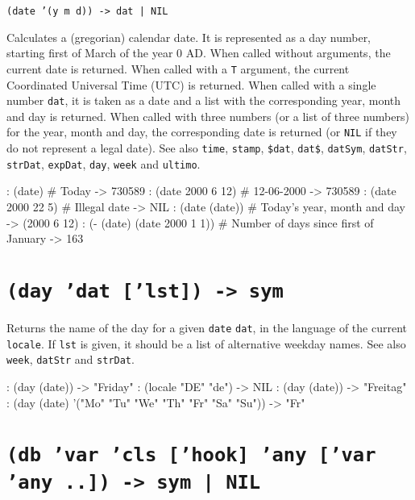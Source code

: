 {\texttt{(date '(y m d)) -> dat | NIL}

Calculates a (gregorian) calendar date. It is represented as a day
number, starting first of March of the year 0 AD. When called without
arguments, the current date is returned. When called with a \texttt{T}
argument, the current Coordinated Universal Time (UTC) is returned. When
called with a single number \texttt{dat}, it is taken as a date and a list with
the corresponding year, month and day is returned. When called with
three numbers (or a list of three numbers) for the year, month and day,
the corresponding date is returned (or \texttt{NIL} if they do not represent a
legal date). See also \texttt{time}, \texttt{stamp}, \texttt{\$dat}, \texttt{dat\$}, \texttt{datSym},
\texttt{datStr}, \texttt{strDat}, \texttt{expDat}, \texttt{day}, \texttt{week} and \texttt{ultimo}.


\begin{wideverbatim}
: (date)                         # Today
-> 730589
: (date 2000 6 12)               # 12-06-2000
-> 730589
: (date 2000 22 5)               # Illegal date
-> NIL
: (date (date))                  # Today's year, month and day
-> (2000 6 12)
: (- (date) (date 2000 1 1))     # Number of days since first of January
-> 163
\end{wideverbatim}

 
\section*{\texttt{(day 'dat ['lst]) -> sym}}
\label{sec:func-ref-D-(day 'dat ['lst]) -> sym}


Returns the name of the day for a given \texttt{date} \texttt{dat}, in the language of
the current \texttt{locale}. If \texttt{lst} is given, it should be a list of
alternative weekday names. See also \texttt{week}, \texttt{datStr} and \texttt{strDat}.


\begin{wideverbatim}
: (day (date))
-> "Friday"
: (locale "DE" "de")
-> NIL
: (day (date))
-> "Freitag"
: (day (date) '("Mo" "Tu" "We" "Th" "Fr" "Sa" "Su"))
-> "Fr"
\end{wideverbatim}

 
\section*{\texttt{(db 'var 'cls ['hook] 'any ['var 'any ..]) -> sym | NIL}}
\label{sec:func-ref-D-(db 'var 'cls ['hook] 'any ['var 'any ..]) -> sym | NIL}


}
